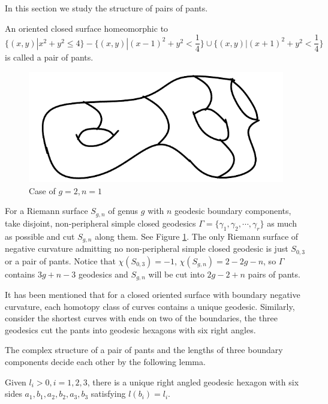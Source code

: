 In this section we study the structure of pairs of pants.

An oriented closed surface homeomorphic to $$\{(x,y)|x^2+y^2\leq 4\}-\{(x,y)|(x-1)^2+y^2< \frac{1}{4}\}\cup\{(x,y)|(x+1)^2+y^2< \frac{1}{4}\}$$  is called  a pair of pants. 

\begin{figure}[h]
    \centering
    \includegraphics[width=3 in]{picture/pantsde.png}
    \caption{Case of $g=2,n=1$}
    \label{fig:pantsde}
\end{figure}

For a Riemann surface $S_{g,n}$ of genus $g$ with $n$ geodesic boundary components, take disjoint, non-peripheral simple closed geodesics $\Gamma=\{\gamma_1,\gamma_2,\cdots,\gamma_r\}$ as much as possible and cut   $S_{g,n}$ along them. See Figure \ref{fig:pantsde}. The only Riemann surface of negative  curvature admitting  no non-peripheral simple closed geodesic is just $S_{0,3}$ or a pair of pants. Notice that $\chi(S_{0,3})=-1$, $\chi(S_{g,n})=2-2g-n$, so $\Gamma$ contains $3g+n-3$ geodesics and $S_{g,n}$ will be cut into $2g-2+n$ pairs of pants.


It has been mentioned that for a closed oriented surface with boundary negative curvature, each homotopy class of curves contains a unique geodesic. Similarly, consider the shortest curves with ends on two of the boundaries, the three geodesics cut the pants into  geodesic hexagons with six right angles. 

The complex structure of a  pair of pants and the lengths of three boundary components decide each other by the following lemma. \cite{Imayoshi1992An}

\begin{lemma}\label{uni}
 Given $l_i>0,i=1,2,3$, there is a unique right angled geodesic hexagon with six sides $a_1,b_1,a_2,b_2,a_3,b_3$ satisfying $l(b_i)=l_i$.
 \end{lemma}
 
